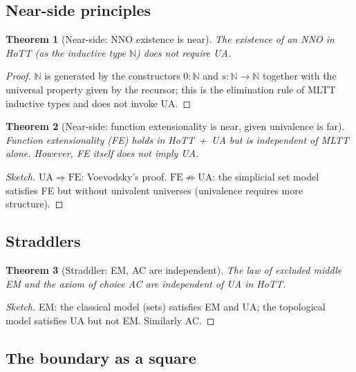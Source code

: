 \documentclass[12pt]{article}
\newtheorem{theorem}{Theorem}[section]
\theoremstyle{definition}
\theoremstyle{remark}
\begin{document}
\subsection{Near-side principles}

\begin{theorem}[Near-side: NNO existence is near]
\label{thm:nnonear}
The existence of an NNO in HoTT (as the inductive type $\mathbb{N}$) does not require UA.
\end{theorem}
\begin{proof}
$\mathbb{N}$ is generated by the constructors $0:\mathbb{N}$ and $s:\mathbb{N}\to
\mathbb{N}$ together with the universal property given by the recursor; this is the
elimination rule of MLTT inductive types and does not invoke UA.
\end{proof}

\begin{theorem}[Near-side: function extensionality is near, given univalence is far]
\label{thm:fefar}
Function extensionality (FE) holds in HoTT~+~UA but is independent of MLTT alone.
However, FE itself does not imply UA.
\end{theorem}
\begin{proof}[Sketch]
$\mathrm{UA}\Rightarrow \mathrm{FE}$: Voevodsky's proof.
$\mathrm{FE}\not\Rightarrow \mathrm{UA}$: the simplicial set model satisfies FE but
without univalent universes (univalence requires more structure).
\end{proof}

\subsection{Straddlers}

\begin{theorem}[Straddler: EM, AC are independent]
\label{thm:straddlers}
The law of excluded middle EM and the axiom of choice AC are independent of UA in HoTT.
\end{theorem}
\begin{proof}[Sketch]
EM: the classical model (sets) satisfies EM and UA; the topological model satisfies UA
but not EM. Similarly AC.
\end{proof}

\subsection{The boundary as a square}
\end{document}
